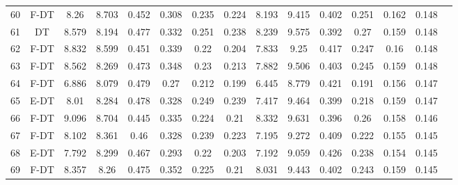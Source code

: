 \begin{longtable}{@{\hskip3pt}c@{\hskip3pt}c@{\hskip3pt}c@{\hskip3pt}c@{\hskip3pt}c@{\hskip3pt}c@{\hskip3pt}c@{\hskip3pt}c@{\hskip3pt}c@{\hskip3pt}c@{\hskip3pt}c@{\hskip3pt}c@{\hskip3pt}c@{\hskip3pt}c@{\hskip3pt}c}
         60 &           F-DT &              8.26 &       8.703 &           0.452 &           0.308 &           0.235 &           0.224 &               8.193 &       9.415 &           0.402 &         0.251 &          0.162 &           0.148 \\
         61 &             DT &             8.579 &       8.194 &           0.477 &           0.332 &           0.251 &           0.238 &               8.239 &       9.575 &           0.392 &          0.27 &          0.159 &           0.148 \\
         62 &           F-DT &             8.832 &       8.599 &           0.451 &           0.339 &            0.22 &           0.204 &               7.833 &        9.25 &           0.417 &         0.247 &           0.16 &           0.148 \\
         63 &           F-DT &             8.562 &       8.269 &           0.473 &           0.348 &            0.23 &           0.213 &               7.882 &       9.506 &           0.403 &         0.245 &          0.159 &           0.148 \\
         64 &           F-DT &             6.886 &       8.079 &           0.479 &            0.27 &           0.212 &           0.199 &               6.445 &       8.779 &           0.421 &         0.191 &          0.156 &           0.147 \\
         65 &           E-DT &              8.01 &       8.284 &           0.478 &           0.328 &           0.249 &           0.239 &               7.417 &       9.464 &           0.399 &         0.218 &          0.159 &           0.147 \\
         66 &           F-DT &             9.096 &       8.704 &           0.445 &           0.335 &           0.224 &            0.21 &               8.332 &       9.631 &           0.396 &          0.26 &          0.158 &           0.146 \\
         67 &           F-DT &             8.102 &       8.361 &            0.46 &           0.328 &           0.239 &           0.223 &               7.195 &       9.272 &           0.409 &         0.222 &          0.155 &           0.145 \\
         68 &           E-DT &             7.792 &       8.299 &           0.467 &           0.293 &            0.22 &           0.203 &               7.192 &       9.059 &           0.426 &         0.238 &          0.154 &           0.145 \\
         69 &           F-DT &             8.357 &        8.26 &           0.475 &           0.352 &           0.225 &            0.21 &               8.031 &       9.443 &           0.402 &         0.243 &          0.159 &           0.145 \\

\end{longtable}
